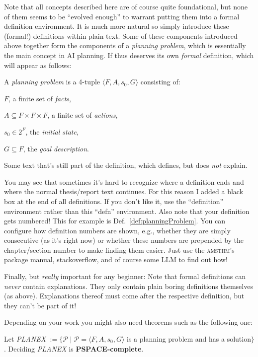 Note that all concepts described here are of course quite foundational, but none of them seems to be ``evolved enough'' to warrant putting them into a formal definition environment. It is much more natural so simply introduce these (formal!) definitions within plain text. Some of these components introduced above together form the components of a \emph{planning problem}, which is essentially the main concept in AI planning. If thus deserves its own \emph{formal} definition, which will appear as follows:
  
\begin{defn}\label{def:planningProblem}A \emph{planning problem} is a 4-tuple $\langle F, A, s_0, G\rangle$ consisting of:
    \begin{compactitem}
      \item $F$, a finite set of \emph{facts},
      \item $A\subseteq F\times F\times F$, a finite set of \emph{actions},
      \item $s_0\in 2^F$, the \emph{initial state},
      \item $G\subseteq F$, the \emph{goal description}.
    \end{compactitem}
    Some text that's still part of the definition, which defines, but does \emph{not} explain.
\end{defn}
  
You may see that sometimes it's hard to recognize where a definition ends and where the normal thesis/report text continues. For this reason I added a black box at the end of all definitions. If you don't like it, use the ``definition'' environment rather than this ``defn'' environment. Also note that your definition gets numbered! This for example is Def.~\ref{def:planningProblem}. You can configure how definition numbers are shown, e.g., whether they are simply consecutive (as it's right now) or whether these numbers are prepended by the chapter/section number to make finding them easier. Just use the \textsc{amsthm}'s package manual, stackoverflow, and of course some LLM to find out how!
  
Finally, but \emph{really} important for any beginner: Note that formal definitions can \emph{never} contain explanations. They only contain plain boring definitions themselves (as above). Explanations thereof must come after the respective definition, but they can't be part of it!
  
Depending on your work you might also need theorems such as the following one:
\begin{thm}\label{thm:hardnessOfPlanningProblems}%
  Let \emph{PLANEX} $:= \{\mathcal{P} \mid \mathcal{P}=\langle F, A, s_0, G\rangle$ is a planning problem and has a solution$\}$. Deciding \emph{PLANEX} is \textbf{PSPACE-complete}.
\end{thm}
  
